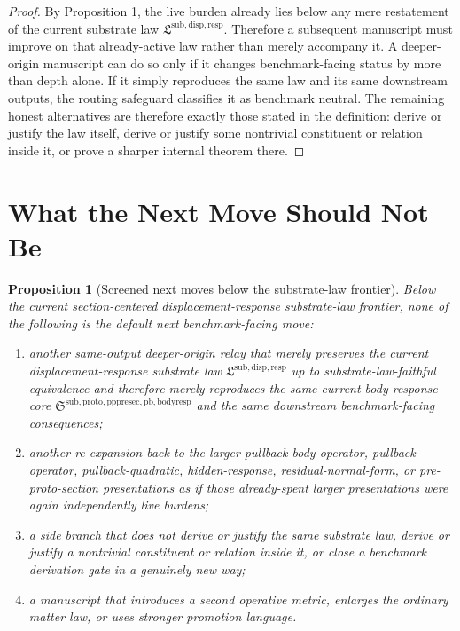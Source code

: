 \documentclass[11pt]{article}
\newcommand{\PullbackBodyResponseCore}{\mathfrak S^{\mathrm{sub,proto,pppresec,pb,bodyresp}}}
\newcommand{\SubstrateLaw}{\mathfrak L^{\mathrm{sub,disp,resp}}}
\newtheorem{proposition}{Proposition}
\begin{document}
\begin{proof}
By Proposition 1, the live burden already lies below any mere restatement of the current substrate law \(\SubstrateLaw\). Therefore a subsequent manuscript must improve on that already-active law rather than merely accompany it. A deeper-origin manuscript can do so only if it changes benchmark-facing status by more than depth alone. If it simply reproduces the same law and its same downstream outputs, the routing safeguard classifies it as benchmark neutral. The remaining honest alternatives are therefore exactly those stated in the definition: derive or justify the law itself, derive or justify some nontrivial constituent or relation inside it, or prove a sharper internal theorem there.
\end{proof}

\section{What the Next Move Should Not Be}

\begin{proposition}[Screened next moves below the substrate-law frontier]
Below the current section-centered displacement-response substrate-law frontier, none of the following is the default next benchmark-facing move:
\begin{enumerate}
    \item another same-output deeper-origin relay that merely preserves the current displacement-response substrate law \(\SubstrateLaw\) up to substrate-law-faithful equivalence and therefore merely reproduces the same current body-response core \(\PullbackBodyResponseCore\) and the same downstream benchmark-facing consequences;
    \item another re-expansion back to the larger pullback-body-operator, pullback-operator, pullback-quadratic, hidden-response, residual-normal-form, or pre-proto-section presentations as if those already-spent larger presentations were again independently live burdens;
    \item a side branch that does not derive or justify the same substrate law, derive or justify a nontrivial constituent or relation inside it, or close a benchmark derivation gate in a genuinely new way;
    \item a manuscript that introduces a second operative metric, enlarges the ordinary matter law, or uses stronger promotion language.
\end{enumerate}
\end{proposition}
\end{document}
